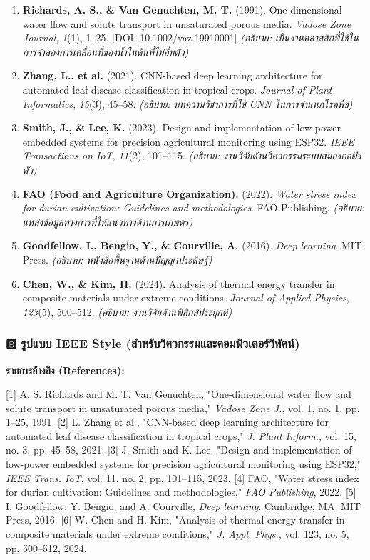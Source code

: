 \documentclass[11pt,a4paper,openany]{report}
\begin{document}
\begin{enumerate}
  \item \textbf{Richards, A. S., \& Van Genuchten, M. T.} (1991). One-dimensional water flow and solute transport in unsaturated porous media. \textit{Vadose Zone Journal}, \textit{1}(1), 1–25. [DOI: 10.1002/vaz.19910001]
  \textit{(อธิบาย: เป็นงานคลาสสิกที่ใช้ในการจำลองการเคลื่อนที่ของน้ำในดินที่ไม่อิ่มตัว)}
  \item \textbf{Zhang, L., et al.} (2021). CNN-based deep learning architecture for automated leaf disease classification in tropical crops. \textit{Journal of Plant Informatics}, \textit{15}(3), 45–58.
  \textit{(อธิบาย: บทความวิชาการที่ใช้ CNN ในการจำแนกโรคพืช)}
  \item \textbf{Smith, J., \& Lee, K.} (2023). Design and implementation of low-power embedded systems for precision agricultural monitoring using ESP32. \textit{IEEE Transactions on IoT}, \textit{11}(2), 101–115.
  \textit{(อธิบาย: งานวิจัยด้านวิศวกรรมระบบสมองกลฝังตัว)}
  \item \textbf{FAO (Food and Agriculture Organization).} (2022). \textit{Water stress index for durian cultivation: Guidelines and methodologies}. FAO Publishing.
  \textit{(อธิบาย: แหล่งข้อมูลทางการที่ให้แนวทางด้านการเกษตร)}
  \item \textbf{Goodfellow, I., Bengio, Y., \& Courville, A.} (2016). \textit{Deep learning}. MIT Press.
  \textit{(อธิบาย: หนังสือพื้นฐานด้านปัญญาประดิษฐ์)}
  \item \textbf{Chen, W., \& Kim, H.} (2024). Analysis of thermal energy transfer in composite materials under extreme conditions. \textit{Journal of Applied Physics}, \textit{123}(5), 500–512.
  \textit{(อธิบาย: งานวิจัยด้านฟิสิกส์ประยุกต์)}
\end{enumerate}


\subsubsection{🅱️ รูปแบบ IEEE Style (สำหรับวิศวกรรมและคอมพิวเตอร์วิทัศน์)}


\textbf{รายการอ้างอิง (References):}

[1] A. S. Richards and M. T. Van Genuchten, "One-dimensional water flow and solute transport in unsaturated porous media," \textit{Vadose Zone J.}, vol. 1, no. 1, pp. 1–25, 1991.
[2] L. Zhang et al., "CNN-based deep learning architecture for automated leaf disease classification in tropical crops," \textit{J. Plant Inform.}, vol. 15, no. 3, pp. 45–58, 2021.
[3] J. Smith and K. Lee, "Design and implementation of low-power embedded systems for precision agricultural monitoring using ESP32," \textit{IEEE Trans. IoT}, vol. 11, no. 2, pp. 101–115, 2023.
[4] FAO, "Water stress index for durian cultivation: Guidelines and methodologies," \textit{FAO Publishing}, 2022.
[5] I. Goodfellow, Y. Bengio, and A. Courville, \textit{Deep learning}. Cambridge, MA: MIT Press, 2016.
[6] W. Chen and H. Kim, "Analysis of thermal energy transfer in composite materials under extreme conditions," \textit{J. Appl. Phys.}, vol. 123, no. 5, pp. 500–512, 2024.
\end{document}
